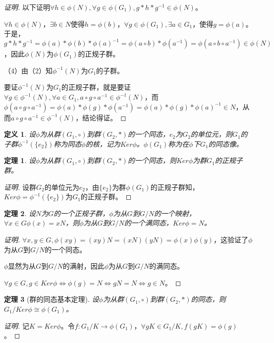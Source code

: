 \documentclass{article}
\newtheorem{Def}{定义}
\newtheorem{Thm}{定理}
\begin{document}
\begin{CJK*}{UTF8}{gbsn}
\begin{proof}[证明]
  以下证明$\forall h\in \phi(N), \forall g\in \phi(G_1), g*h*g^{-1}\in \phi(N)$。

  $\forall h\in \phi(N)$，$\exists b\in N$使得$h=\phi(b)$，$\forall g\in \phi(G_1),\exists a\in G_1$，使得$g=\phi(a)$。于是，$g*h*g^{-1}=\phi(a)*\phi(b)*\phi(a)^{-1}=\phi(a\circ b)*\phi(a^{-1})=\phi(a\circ b\circ a^{-1})\in \phi(N)$，因此$\phi(N)$为$\phi(G_1)$的正规子群。

  （4）由（2）知$\phi^{-1}(N)$为$G_1$的子群。

  要证$\phi^{-1}(N)$为$G_1$的正规子群，就是要证$\forall g\in \phi^{-1}(N), \forall a\in G_1, a\circ g\circ a^{-1}\in \phi^{-1}(N)$，而$\phi(a\circ g\circ a^{-1})=\phi(a)*\phi(g)*\phi(a^{-1})=\phi(a)*\phi(g)*\phi(a)^{-1}\in N$，从而$a\circ g\circ a^{-1}\in \phi^{-1}(N)$，结论得证。

\end{proof}

\begin{Def}
设$\phi$为从群$(G_1,\circ)$到群$(G_2,*)$的一个同态，$e_2$为$G_2$的单位元，则$G_1$的子群$\phi^{-1}(\{e_2\})$称为同态$\phi$的核，记为$Ker \phi$。$\phi(G_1)$称为在$\phi$下$G_1$的同态像。
\end{Def}

\begin{Thm}
  设$\phi$为从群$(G_1,\circ)$到群$(G_2,*)$的一个同态，则$Ker \phi$为群$G_1$的正规子群。
\end{Thm}
\begin{proof}[证明]
  设群$G_2$的单位元为$e_2$，由$\{e_2\}$为群$\phi(G_1)$的正规子群知，$Ker \phi =\phi^{-1}(\{e_2\})$为$G_1$的正规子群。
\end{proof}
\begin{Thm}
设$N$为$G$的一个正规子群，$\phi$为从$G$到$G/N$的一个映射，$\forall x\in G \phi(x)=xN$，则$\phi$为从$G$到$G/N$的一个满同态，$Ker \phi=N$。
\end{Thm}
\begin{proof}[证明]
  $\forall x,y\in G, \phi(xy)=(xy)N=(xN)(yN)=\phi(x)\phi(y)$，这验证了$\phi$为从$G$到$G/N$的一个同态。

  $\phi$显然为从$G$到$G/N$的满射，因此$\phi$为从$G$到$G/N$的满同态。

  $\forall g\in G, g\in Ker\phi \Leftrightarrow \phi(g)=N \Leftrightarrow gN=N \Leftrightarrow g\in N$。
\end{proof}
\begin{Thm}[群的同态基本定理]
设$\phi$为从群$(G_1,\circ)$到群$(G_2,*)$的同态，则$G_1/Ker \phi \cong \phi(G_1)$。
\end{Thm}
\begin{proof}[证明]
记$K=Ker\phi$。令$f:G_1/K\to \phi(G_1)$，$\forall gK\in G_1/K, f(gK)=\phi(g)$。


\end{proof}
\end{CJK*}
\end{document}
